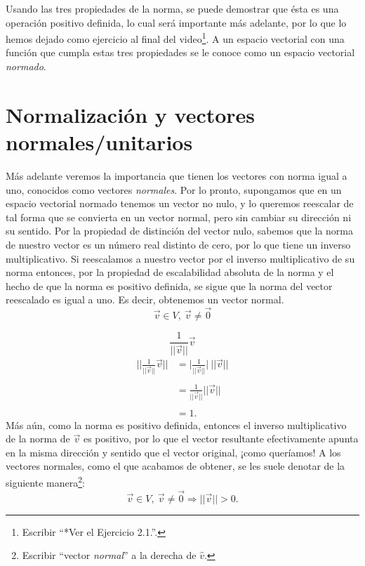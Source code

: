 \documentclass[12pt,dvipsnames]{article}
\numberwithin{equation}{section}
\begin{document}
Usando las tres propiedades de la norma, se puede demostrar que ésta es una operación positivo definida, lo cual será importante más adelante, por lo que lo hemos dejado como ejercicio al final del video\footnote{Escribir ``*Ver el Ejercicio 2.1.''.}. A un espacio vectorial con una función que cumpla estas tres propiedades se le conoce como un espacio vectorial \emph{normado}.


\section{Normalización y vectores normales/unitarios}

Más adelante veremos la importancia que tienen los vectores con norma igual a uno, conocidos como vectores \emph{normales}. Por lo pronto, supongamos que en un espacio vectorial normado tenemos un vector no nulo, y lo queremos reescalar de tal forma que se convierta en un vector normal, pero sin cambiar su dirección ni su sentido. Por la propiedad de distinción del vector nulo, sabemos que la norma de nuestro vector es un número real distinto de cero, por lo que tiene un inverso multiplicativo. Si reescalamos a nuestro vector por el inverso multiplicativo de su norma entonces, por la propiedad de escalabilidad absoluta de la norma y el hecho de que la norma es positivo definida, se sigue que la norma del vector reescalado es igual a uno. Es decir, obtenemos un vector normal.
\[
    \vec{v}\in V, \ \vec{v}\neq \vec{0}
\] 

\[
\frac{1}{||\vec{v}||} \vec{v}
\] 
\begin{align*}
    \bigg|\bigg|\frac{1}{||\vec{v}||} \vec{v} \bigg|\bigg| &= \bigg| \frac{1}{||\vec{v}||} \bigg| \ ||\vec{v}|| \tag{escalabilidad absoluta} \\ \\
                                                           &= \frac{1}{||\vec{v}||} ||\vec{v}|| \tag{Ejercicio 2.1} \\ \\
                                                                       &=1.
\end{align*}
\noindent Más aún, como la norma es positivo definida, entonces el inverso multiplicativo de la norma de $\vec{v}$ es positivo, por lo que el vector resultante efectivamente apunta en la misma dirección y sentido que el vector original, ¡como queríamos! A los vectores normales, como el que acabamos de obtener, se les suele denotar de la siguiente manera\footnote{Escribir ``vector \emph{normal}'' a la derecha de $\hat{v}$.}: 
\[
    \vec{v}\in V, \ \vec{v}\neq \vec{0} \Rightarrow ||\vec{v}||>0.
\] 
\end{document}
